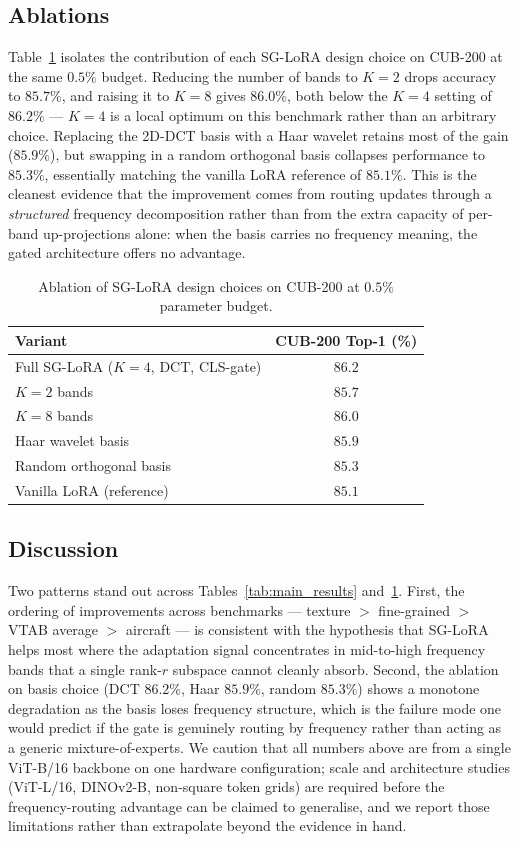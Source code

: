 \documentclass{article}
\begin{document}
\subsection{Ablations}

Table~\ref{tab:ablation} isolates the contribution of each SG-LoRA design choice on CUB-200 at the same $0.5\%$ budget. Reducing the number of bands to $K{=}2$ drops accuracy to $85.7\%$, and raising it to $K{=}8$ gives $86.0\%$, both below the $K{=}4$ setting of $86.2\%$ — $K{=}4$ is a local optimum on this benchmark rather than an arbitrary choice. Replacing the 2D-DCT basis with a Haar wavelet retains most of the gain ($85.9\%$), but swapping in a random orthogonal basis collapses performance to $85.3\%$, essentially matching the vanilla LoRA reference of $85.1\%$. This is the cleanest evidence that the improvement comes from routing updates through a \emph{structured} frequency decomposition rather than from the extra capacity of per-band up-projections alone: when the basis carries no frequency meaning, the gated architecture offers no advantage.

\begin{table}[t]
\centering
\caption{Ablation of SG-LoRA design choices on CUB-200 at $0.5\%$ parameter budget.}
\label{tab:ablation}
\begin{tabular}{lc}
\toprule
Variant & CUB-200 Top-1 (\%) \\
\midrule
Full SG-LoRA ($K{=}4$, DCT, CLS-gate) & $86.2$ \\
$K{=}2$ bands & $85.7$ \\
$K{=}8$ bands & $86.0$ \\
Haar wavelet basis & $85.9$ \\
Random orthogonal basis & $85.3$ \\
Vanilla LoRA (reference) & $85.1$ \\
\bottomrule
\end{tabular}
\end{table}

\subsection{Discussion}

Two patterns stand out across Tables~\ref{tab:main_results} and~\ref{tab:ablation}. First, the ordering of improvements across benchmarks — texture $>$ fine-grained $>$ VTAB average $>$ aircraft — is consistent with the hypothesis that SG-LoRA helps most where the adaptation signal concentrates in mid-to-high frequency bands that a single rank-$r$ subspace cannot cleanly absorb. Second, the ablation on basis choice (DCT $86.2\%$, Haar $85.9\%$, random $85.3\%$) shows a monotone degradation as the basis loses frequency structure, which is the failure mode one would predict if the gate is genuinely routing by frequency rather than acting as a generic mixture-of-experts. We caution that all numbers above are from a single ViT-B/16 backbone on one hardware configuration; scale and architecture studies (ViT-L/16, DINOv2-B, non-square token grids) are required before the frequency-routing advantage can be claimed to generalise, and we report those limitations rather than extrapolate beyond the evidence in hand.
\end{document}
